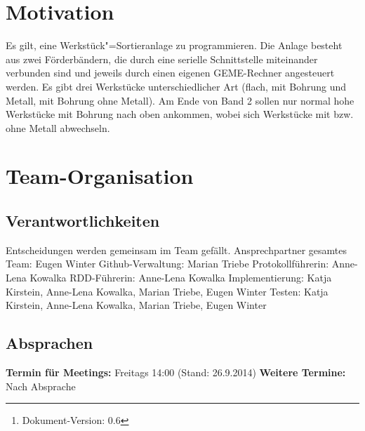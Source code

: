 \documentclass[oneside,a4paper,titlepage]{scrartcl} %
\begin{document}
\date{\today\thanks{Dokument-Version: 0.6}} %
\maketitle
\setcounter{page}{1}

\tableofcontents

\newpage

\section{Motivation}
Es gilt, eine Werkstück"=Sortieranlage zu programmieren. Die Anlage besteht aus zwei
Förderbändern, die durch eine serielle Schnittstelle miteinander verbunden sind und jeweils durch
einen eigenen GEME-Rechner angesteuert werden.
Es gibt drei Werkstücke unterschiedlicher Art (flach, mit Bohrung und Metall, mit Bohrung ohne
Metall). Am Ende von Band 2 sollen nur normal hohe Werkstücke mit Bohrung nach oben
ankommen, wobei sich Werkstücke mit bzw. ohne Metall abwechseln.

\section{Team-Organisation}

\subsection{Verantwortlichkeiten}
Entscheidungen werden gemeinsam im Team gefällt.\newline
Ansprechpartner gesamtes Team: Eugen Winter\newline
Github-Verwaltung: Marian Triebe\newline
Protokollführerin: Anne-Lena Kowalka\newline
RDD-Führerin: Anne-Lena Kowalka\newline
Implementierung: Katja Kirstein, Anne-Lena Kowalka, Marian Triebe, Eugen Winter\newline
Testen: Katja Kirstein, Anne-Lena Kowalka, Marian Triebe, Eugen Winter\newline

\subsection{Absprachen}
\textbf{Termin für Meetings:} Freitags 14:00 (Stand: 26.9.2014)\newline
\textbf{Weitere Termine:} Nach Absprache
\end{document}
